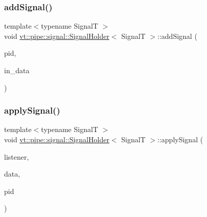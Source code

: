 \subsubsection{\texorpdfstring{add\+Signal()}{addSignal()}}
{\footnotesize\ttfamily template$<$typename SignalT $>$ \\
void \hyperlink{structvt_1_1pipe_1_1signal_1_1_signal_holder}{vt\+::pipe\+::signal\+::\+Signal\+Holder}$<$ SignalT $>$\+::add\+Signal (\begin{DoxyParamCaption}\item[{\hyperlink{namespacevt_ac9852acda74d1896f48f406cd72c7bd3}{Pipe\+Type} const \&}]{pid,  }\item[{\hyperlink{structvt_1_1pipe_1_1signal_1_1_signal_holder_aad5bfc2b46dfa071ae638385324d7e31}{Data\+Ptr\+Type}}]{in\+\_\+data }\end{DoxyParamCaption})}

\mbox{\label{structvt_1_1pipe_1_1signal_1_1_signal_holder_a611fe4b2ce38900245e2f4a9dd40d5dc}} 
\subsubsection{\texorpdfstring{apply\+Signal()}{applySignal()}}
{\footnotesize\ttfamily template$<$typename SignalT $>$ \\
void \hyperlink{structvt_1_1pipe_1_1signal_1_1_signal_holder}{vt\+::pipe\+::signal\+::\+Signal\+Holder}$<$ SignalT $>$\+::apply\+Signal (\begin{DoxyParamCaption}\item[{\hyperlink{structvt_1_1pipe_1_1signal_1_1_signal_holder_a68114d1ad5804c71e014736b18e41e08}{Listener\+Ptr\+Type}}]{listener,  }\item[{\hyperlink{structvt_1_1pipe_1_1signal_1_1_signal_holder_aad5bfc2b46dfa071ae638385324d7e31}{Data\+Ptr\+Type}}]{data,  }\item[{\hyperlink{namespacevt_ac9852acda74d1896f48f406cd72c7bd3}{Pipe\+Type} const \&}]{pid }\end{DoxyParamCaption})}

\mbox{\label{structvt_1_1pipe_1_1signal_1_1_signal_holder_abcd78906fca701244f0f13089b5f5057}} 
